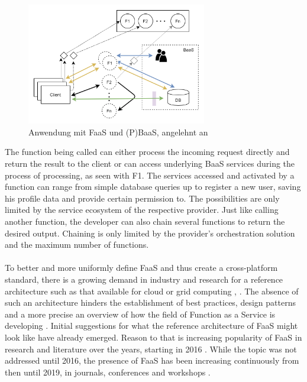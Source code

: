 \documentclass[11pt]{article}
\begin{document}
\begin{figure}[H]
\caption{Anwendung mit FaaS und (P)BaaS, angelehnt an \cite{shafiei2020serverless}}
\label{fig:FaaSBaaSExample}
\centering
\includegraphics[width=0.7\textwidth]{FaaS}
\end{figure}
The function being called can either process the incoming request directly and return the result to the client or can access underlying BaaS services during the process of processing, as seen with F1. The services accessed and activated by a function can range from simple database queries up to register a new user, saving his profile data and provide certain permission to. The possibilities are only limited by the service ecosystem of the respective provider. Just like calling another function, the developer can also chain several functions to return the desired output. Chaining is only limited by the provider's orchestration solution and the maximum number of functions. \\\\
To better and more uniformly define FaaS and thus create a cross-platform standard, there is a growing demand in industry and research for a reference architecture such as that available for cloud or grid computing \cite{liu2011nist}, \cite{foster2003grid}. The absence of such an architecture hinders the establishment of best practices, design patterns and a more precise an overview of how the field of Function as a Service is developing \cite{leitner2019mixed}. Initial suggestions for what the reference architecture of FaaS might look like have already emerged. Reason to that is increasing popularity of FaaS in research and literature over the years, starting in 2016  \cite{van2019spec}. While the topic was not addressed until 2016, the presence of FaaS has been increasing continuously from then until 2019, in journals, conferences and workshops \cite{Yussupov2019_SystematicMappingStudyFaaS}.
\end{document}
